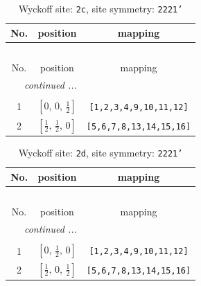 \documentclass[fleqn,8pt]{jsarticle}
\begin{document}
\renewcommand{\arraystretch}{1.2}
\begin{longtable}{ccc}
\caption{Wyckoff site: {\tt 2c}, site symmetry: {\tt 2221'}}
 \\
 \hline \hline
No. & position & mapping \\ \hline \endfirsthead

\multicolumn{2}{l}{\tablename\ \thetable{}} \\
 \hline \hline
No. & position & mapping \\ \hline \endhead

 \hline \hline
\multicolumn{2}{r}{\footnotesize\it continued ...} \\ \endfoot

 \hline \hline
\multicolumn{2}{r}{} \\ \endlastfoot

1 & $\left[ 0,\, 0,\, \frac{1}{2} \right]$ & {\tt [1,2,3,4,9,10,11,12]} \\ \hline
2 & $\left[ \frac{1}{2},\, \frac{1}{2},\, 0 \right]$ & {\tt [5,6,7,8,13,14,15,16]} \\
\end{longtable}
\renewcommand{\arraystretch}{1.2}
\begin{longtable}{ccc}
\caption{Wyckoff site: {\tt 2d}, site symmetry: {\tt 2221'}}
 \\
 \hline \hline
No. & position & mapping \\ \hline \endfirsthead

\multicolumn{2}{l}{\tablename\ \thetable{}} \\
 \hline \hline
No. & position & mapping \\ \hline \endhead

 \hline \hline
\multicolumn{2}{r}{\footnotesize\it continued ...} \\ \endfoot

 \hline \hline
\multicolumn{2}{r}{} \\ \endlastfoot

1 & $\left[ 0,\, \frac{1}{2},\, 0 \right]$ & {\tt [1,2,3,4,9,10,11,12]} \\ \hline
2 & $\left[ \frac{1}{2},\, 0,\, \frac{1}{2} \right]$ & {\tt [5,6,7,8,13,14,15,16]} \\
\end{longtable}
\renewcommand{\arraystretch}{1.2}
\end{document}
